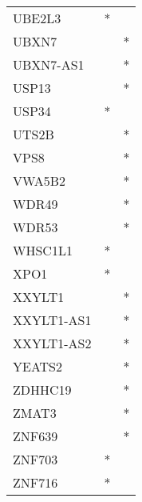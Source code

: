\begin{longtable}{lcc}
UBE2L3           &              * &            \\
UBXN7            &                &          * \\
UBXN7-AS1        &                &          * \\
USP13            &                &          * \\
USP34            &              * &            \\
UTS2B            &                &          * \\
VPS8             &                &          * \\
VWA5B2           &                &          * \\
WDR49            &                &          * \\
WDR53            &                &          * \\
WHSC1L1          &              * &            \\
XPO1             &              * &            \\
XXYLT1           &                &          * \\
XXYLT1-AS1       &                &          * \\
XXYLT1-AS2       &                &          * \\
YEATS2           &                &          * \\
ZDHHC19          &                &          * \\
ZMAT3            &                &          * \\
ZNF639           &                &          * \\
ZNF703           &              * &            \\
ZNF716           &              * &            \\
\end{longtable}
